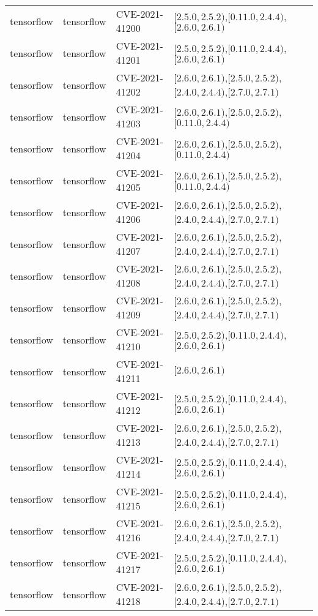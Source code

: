 \begin{tabular}{llll}
tensorflow & tensorflow & CVE-2021-41200 & $[2.5.0,2.5.2)$,$[0.11.0,2.4.4)$,$[2.6.0,2.6.1)$ \\
tensorflow & tensorflow & CVE-2021-41201 & $[2.5.0,2.5.2)$,$[0.11.0,2.4.4)$,$[2.6.0,2.6.1)$ \\
tensorflow & tensorflow & CVE-2021-41202 & $[2.6.0,2.6.1)$,$[2.5.0,2.5.2)$,$[2.4.0,2.4.4)$,$[2.7.0,2.7.1)$ \\
tensorflow & tensorflow & CVE-2021-41203 & $[2.6.0,2.6.1)$,$[2.5.0,2.5.2)$,$[0.11.0,2.4.4)$ \\
tensorflow & tensorflow & CVE-2021-41204 & $[2.6.0,2.6.1)$,$[2.5.0,2.5.2)$,$[0.11.0,2.4.4)$ \\
tensorflow & tensorflow & CVE-2021-41205 & $[2.6.0,2.6.1)$,$[2.5.0,2.5.2)$,$[0.11.0,2.4.4)$ \\
tensorflow & tensorflow & CVE-2021-41206 & $[2.6.0,2.6.1)$,$[2.5.0,2.5.2)$,$[2.4.0,2.4.4)$,$[2.7.0,2.7.1)$ \\
tensorflow & tensorflow & CVE-2021-41207 & $[2.6.0,2.6.1)$,$[2.5.0,2.5.2)$,$[2.4.0,2.4.4)$,$[2.7.0,2.7.1)$ \\
tensorflow & tensorflow & CVE-2021-41208 & $[2.6.0,2.6.1)$,$[2.5.0,2.5.2)$,$[2.4.0,2.4.4)$,$[2.7.0,2.7.1)$ \\
tensorflow & tensorflow & CVE-2021-41209 & $[2.6.0,2.6.1)$,$[2.5.0,2.5.2)$,$[2.4.0,2.4.4)$,$[2.7.0,2.7.1)$ \\
tensorflow & tensorflow & CVE-2021-41210 & $[2.5.0,2.5.2)$,$[0.11.0,2.4.4)$,$[2.6.0,2.6.1)$ \\
tensorflow & tensorflow & CVE-2021-41211 & $[2.6.0,2.6.1)$ \\
tensorflow & tensorflow & CVE-2021-41212 & $[2.5.0,2.5.2)$,$[0.11.0,2.4.4)$,$[2.6.0,2.6.1)$ \\
tensorflow & tensorflow & CVE-2021-41213 & $[2.6.0,2.6.1)$,$[2.5.0,2.5.2)$,$[2.4.0,2.4.4)$,$[2.7.0,2.7.1)$ \\
tensorflow & tensorflow & CVE-2021-41214 & $[2.5.0,2.5.2)$,$[0.11.0,2.4.4)$,$[2.6.0,2.6.1)$ \\
tensorflow & tensorflow & CVE-2021-41215 & $[2.5.0,2.5.2)$,$[0.11.0,2.4.4)$,$[2.6.0,2.6.1)$ \\
tensorflow & tensorflow & CVE-2021-41216 & $[2.6.0,2.6.1)$,$[2.5.0,2.5.2)$,$[2.4.0,2.4.4)$,$[2.7.0,2.7.1)$ \\
tensorflow & tensorflow & CVE-2021-41217 & $[2.5.0,2.5.2)$,$[0.11.0,2.4.4)$,$[2.6.0,2.6.1)$ \\
tensorflow & tensorflow & CVE-2021-41218 & $[2.6.0,2.6.1)$,$[2.5.0,2.5.2)$,$[2.4.0,2.4.4)$,$[2.7.0,2.7.1)$ \\

\end{tabular}
